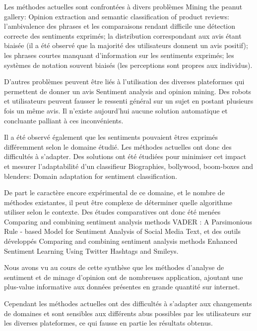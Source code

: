 \documentclass[8pt]{article}
\begin{document}
\begin{multicols}{2}
\par Les méthodes actuelles sont confrontées à divers problèmes {Mining the peanut gallery: Opinion extraction and semantic classification of product reviews}: l’ambivalence des phrases et les comparaisons rendant difficile une détection correcte des sentiments exprimés; la distribution correspondant aux avis étant biaisée (il a été observé que la majorité des utilisateurs donnent un avis positif); les phrases courtes manquant d’information sur les sentiments exprimés; les systèmes de notation souvent biaisés (les perceptions sont propres aux individus).
\par D’autres problèmes peuvent être liés à l’utilisation des diverses plateformes qui permettent de donner un avis {Sentiment analysis and opinion mining}. Des robots et utilisateurs peuvent fausser le ressenti général sur un sujet en postant plusieurs fois un même avis. Il n’existe aujourd’hui aucune solution automatique et concluante palliant à ces inconvénients.
\par Il a été observé également que les sentiments pouvaient êtres exprimés différemment selon le domaine étudié. Les méthodes actuelles ont donc des difficultés à s’adapter. Des solutions ont été étudiées pour minimiser cet impact et mesurer l’adaptabilité d’un classifieur {Biographies, bollywood, boom-boxes and blenders: Domain adaptation for sentiment classification}.
\par De part le caractère encore expérimental de ce domaine, et le nombre de méthodes existantes, il peut être complexe de déterminer quelle algorithme utiliser selon le contexte. Des études comparatives ont donc été menées {Comparing and combining sentiment analysis methods} {VADER : A Parsimonious Rule - based Model for Sentiment Analysis of Social Media Text}, et des outils développés {Comparing and combining sentiment analysis methods} {Enhanced Sentiment Learning Using Twitter Hashtags and Smileys}.


\par Nous avons vu au cours de cette synthèse que les méthodes d’analyse de sentiment et de minage d’opinion ont de nombreuses application, ajoutant une plus-value informative aux données présentes en grande quantité sur internet.
\par Cependant les méthodes actuelles ont des difficultés à s’adapter aux changements de domaines et sont sensibles aux différents abus possibles par les utilisateurs sur les diverses plateformes, ce qui fausse en partie les résultats obtenus.


  \end{multicols}

  \newpage

  
  
  \nocite{*}
\end{document}
